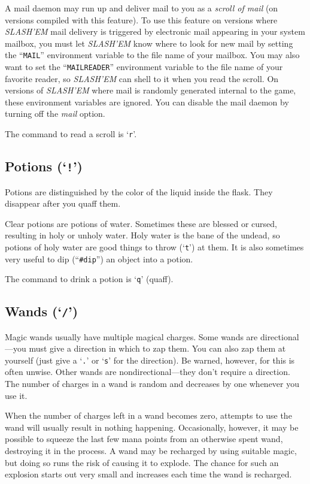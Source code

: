A mail daemon may run up and deliver mail to you as a
{\it scroll of mail\/} (on versions compiled with this feature).
To use this feature on versions where {\it SLASH'EM\/} mail delivery is triggered
by electronic mail appearing in your system mailbox,
you must let {\it SLASH'EM\/} know where to look for new mail by setting
the ``{\tt MAIL}'' environment variable to the file name of your mailbox.
You may also want to set the ``{\tt MAILREADER}'' environment
variable to the file name of your favorite reader, so {\it SLASH'EM\/} can shell to it
when you read the scroll.
On versions of {\it SLASH'EM\/} where mail is randomly generated internal to the game,
these environment variables are ignored.
You can disable the mail daemon by turning off the
{\it mail\/} 
option.

The command to read a scroll is `{\tt r}'.
\subsection*{Potions (`{\tt !}')}


Potions are distinguished by the color of the liquid inside the flask.
They disappear after you quaff them.

Clear potions are potions of water.  Sometimes these are blessed or cursed,
resulting in holy or unholy water.  Holy water is the bane of the undead, so
potions of holy water are good things to throw (`{\tt t}') at them.  It is also
sometimes very useful to dip (``{\tt \#dip}'') an object into a potion.

The command to drink a potion is `{\tt q}' (quaff).
\subsection*{Wands (`{\tt /}')}


Magic wands usually have multiple magical charges.  Some wands are
directional---you must give a direction in which to zap them.  You can also
zap them at yourself (just give a `{\tt .}' or `{\tt s}' for the direction). Be warned,
however, for this is often unwise.  Other wands are nondirectional---they
don't require a direction.  The number of charges in a wand is random and
decreases by one whenever you use it.

When the number of charges left in a wand becomes zero, attempts to use the
wand will usually result in nothing happening.  Occasionally, however, it may
be possible to squeeze the last few mana points from an otherwise spent wand,
destroying it in the process.  A wand may be recharged by using suitable
magic, but doing so runs the risk of causing it to explode.  The chance
for such an explosion starts out very small and increases each time the
wand is recharged.

